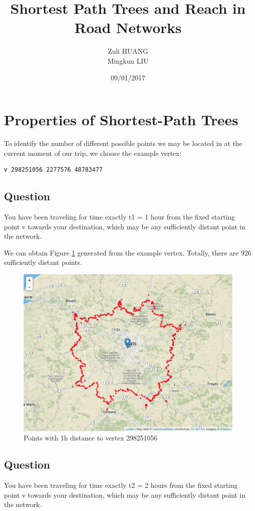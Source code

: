 \documentclass[titlepage,11pt,a4paper]{article}
\title[INF 411 Programming Project]{Shortest Path Trees and Reach in Road Networks}
\author{Zuli \textsc{HUANG}\\
            Mingkun \textsc{LIU}
            }
\date{09/01/2017}
\begin{document}
\maketitle

\section{Properties of Shortest-Path Trees}
To identify the number of different possible points we may be located in at the current moment of our trip, we choose the example vertex:
\begin{verbatim}
v 298251056 2277576 48783477
\end{verbatim}

\subsection{Question}{You have been traveling for time exactly t1 = 1 hour from the fixed starting point v towards your destination, which may be any sufficiently distant point in the network.}

We can obtain Figure \ref{fig:questioin_1.1_out} generated from the example vertex. Totally, there are 926 sufficiently distant points.
\begin{figure}[h]
    \centering
    \includegraphics[width=\textwidth]{map_Q1.1.png}
    \caption{Points with 1h distance to vertex 298251056}
    \label{fig:questioin_1.1_out}
\end{figure}

\subsection{Question}{You have been traveling for time exactly t2 = 2 hours from the fixed starting point v towards your destination, which may be any sufficiently distant point in the network.}
\end{document}
